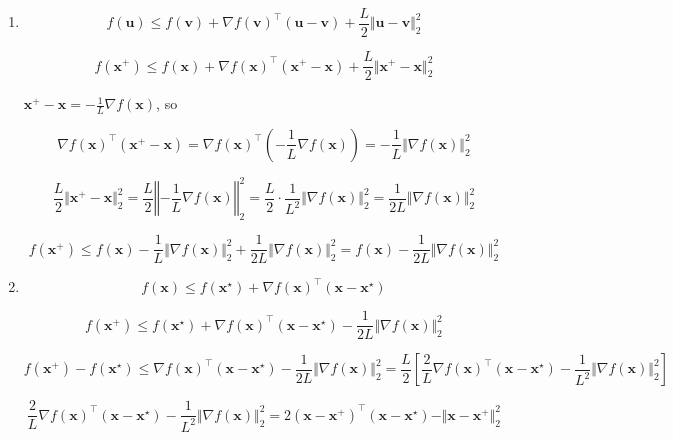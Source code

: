 \documentclass[11pt]{article}
\begin{document}
\begin{enumerate}
    \item[1. ]
    
    $$
    f(\mathbf{u}) \le f(\mathbf{v}) + \nabla f(\mathbf{v})^\top (\mathbf{u} - \mathbf{v}) + \frac{L}{2}\Vert  \mathbf{u} - \mathbf{v}\Vert  _2^2
    $$

    $$
    f(\mathbf{x}^+) \le f(\mathbf{x}) + \nabla f(\mathbf{x})^\top (\mathbf{x}^+ - \mathbf{x}) + \frac{L}{2}\Vert  \mathbf{x}^+ - \mathbf{x}\Vert _2^2
    $$

    $\mathbf{x}^+ - \mathbf{x} = -\frac{1}{L}\nabla f(\mathbf{x})$, so

    $$
    \nabla f(\mathbf{x})^\top (\mathbf{x}^+ - \mathbf{x}) = \nabla f(\mathbf{x})^\top \left(-\frac{1}{L}\nabla f(\mathbf{x})\right) = -\frac{1}{L}\Vert \nabla f(\mathbf{x})\Vert _2^2
    $$

    $$
    \frac{L}{2}\Vert \mathbf{x}^+ - \mathbf{x}\Vert _2^2 = \frac{L}{2}\left\Vert -\frac{1}{L}\nabla f(\mathbf{x})\right\Vert _2^2 = \frac{L}{2} \cdot \frac{1}{L^2}\Vert \nabla f(\mathbf{x})\Vert _2^2 = \frac{1}{2L}\Vert \nabla f(\mathbf{x})\Vert _2^2
    $$

    $$
    f(\mathbf{x}^+) \le f(\mathbf{x}) - \frac{1}{L}\Vert \nabla f(\mathbf{x})\Vert _2^2 + \frac{1}{2L}\Vert \nabla f(\mathbf{x})\Vert _2^2 = f(\mathbf{x}) - \frac{1}{2L}\Vert \nabla f(\mathbf{x})\Vert _2^2
    $$

    \item[2. ]
    
    $$
    f(\mathbf{x})
    \le
    f(\mathbf{x}^\star) + \nabla f(\mathbf{x})^\top (\mathbf{x} - \mathbf{x}^\star)
    $$

    $$
    f(\mathbf{x}^+)
    \le
    f(\mathbf{x}^\star) + \nabla f(\mathbf{x})^\top (\mathbf{x} - \mathbf{x}^\star) - \frac{1}{2L}\Vert \nabla f(\mathbf{x})\Vert _2^2
    $$

    $$
    f(\mathbf{x}^+) - f(\mathbf{x}^\star)
    \le \nabla f(\mathbf{x})^\top (\mathbf{x} - \mathbf{x}^\star) - \frac{1}{2L}\Vert \nabla f(\mathbf{x})\Vert _2^2
    = \frac{L}{2} \left[ \frac{2}{L}\nabla f(\mathbf{x})^\top (\mathbf{x} - \mathbf{x}^\star) - \frac{1}{L^2}\Vert \nabla f(\mathbf{x})\Vert _2^2 \right]
    $$

    $$
    \frac{2}{L}\nabla f(\mathbf{x})^\top (\mathbf{x} - \mathbf{x}^\star) - \frac{1}{L^2}\Vert \nabla f(\mathbf{x})\Vert _2^2
    = 2(\mathbf{x} - \mathbf{x}^+)^\top (\mathbf{x} - \mathbf{x}^\star) - \Vert \mathbf{x} - \mathbf{x}^+\Vert _2^2
    $$


\end{enumerate}
\end{document}
